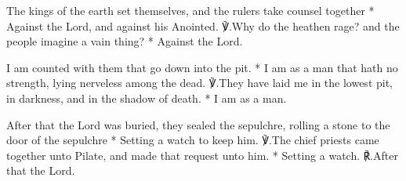 \documentclass[12pt]{book}
\begin{document}


\silently


\begin{enpars}
The kings of the earth set themselves, and the rulers take counsel together
* Against the Lord, and against his Anointed.
℣.\@ Why do the heathen rage? and the people imagine a vain thing?
* Against the Lord.
\end{enpars}


\begin{enpars}
I am counted with them that go down into the pit.
* I am as a man that hath no strength, lying nerveless among the dead.
℣.\@ They have laid me in the lowest pit, in darkness, and in the shadow of death.
* I am as a man.
\end{enpars}


\begin{enpars}
After that the Lord was buried, they sealed the sepulchre, rolling a stone to the door of the sepulchre
* Setting a watch to keep him.
℣.\@ The chief priests came together unto Pilate, and made that request unto him.
* Setting a watch.
℟.\@ After that the Lord.
\end{enpars}

 \lauds
 


\end{document}

